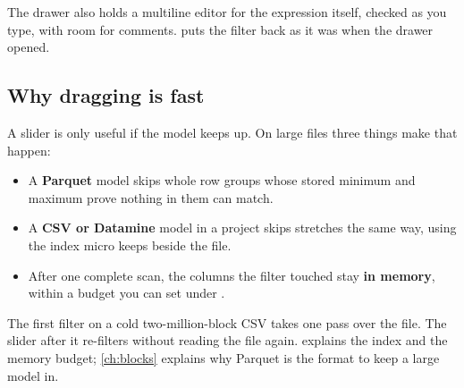 The drawer also holds a multiline editor for the expression itself, checked as you type, with room for \code{\#} comments.  puts the filter back as it was when the drawer opened.


\subsection{Why dragging is fast}
A slider is only useful if the model keeps up. On large files three things make that happen:

\begin{itemize}
\item A \textbf{Parquet} model skips whole row groups whose stored minimum and maximum prove nothing in them can match.
\item A \textbf{CSV or Datamine} model in a project skips stretches the same way, using the index micro keeps beside the file.
\item After one complete scan, the columns the filter touched stay \textbf{in memory}, within a budget you can set under .
\end{itemize}

The first filter on a cold two-million-block CSV takes one pass over the file. The slider after it re-filters without reading the file again.  explains the index and the memory budget; \cref{ch:blocks} explains why Parquet is the format to keep a large model in.

